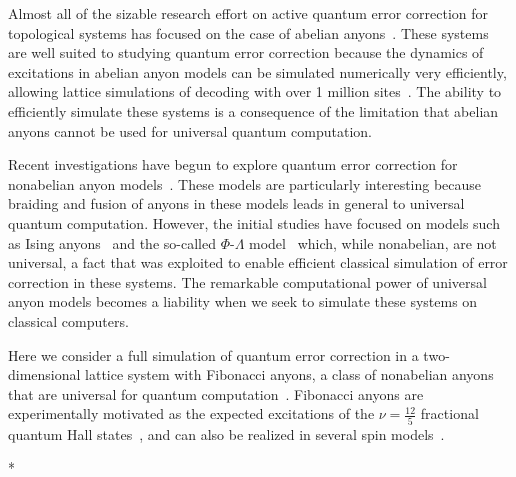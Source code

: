 \documentclass[aps, prl, letterpaper, twocolumn, superscriptaddress, notitlepage]{revtex4-1}
\begin{document}
Almost all of the sizable research effort on active quantum error correction for topological 
systems has focused on the case of abelian anyons~\cite{Terhal2014}. These systems are 
well suited to studying quantum error correction because the dynamics of excitations in 
abelian anyon models can be simulated numerically very efficiently, allowing lattice 
simulations of decoding with over 1 million sites~\cite{Duclos-Cianci2010}. The ability to 
efficiently simulate these systems is a consequence of the limitation that abelian anyons 
cannot be used for universal quantum computation. 

Recent investigations have begun to explore quantum error correction for nonabelian anyon 
models~\cite{Brell2013, Wootton2013, Hutter2014}. These models are particularly interesting 
because braiding and fusion of anyons in these models leads in general to universal quantum 
computation. However, the initial studies have focused on models such as Ising 
anyons~\cite{Brell2013} and the so-called $\Phi$-$\Lambda$ 
model~\cite{Wootton2013, Hutter2014} which, while nonabelian, are not universal, a fact 
that was exploited to enable efficient classical simulation of error correction in these systems. 
The remarkable computational power of universal anyon models becomes a liability when we 
seek to simulate these systems on classical computers. 

Here we consider a full simulation of quantum error correction in a two-dimensional lattice 
system with Fibonacci anyons, a class of nonabelian anyons that are universal for quantum 
computation~\cite{Wang2010b}. Fibonacci anyons are experimentally motivated as the 
expected excitations of the $\nu=\frac{12}{5}$ fractional quantum Hall 
states~\cite{Slingerland2001}, and can also be realized in several spin 
models~\cite{Levin2005, Kapit2013, Palumbo2014}. 


\/* %
\end{document}
